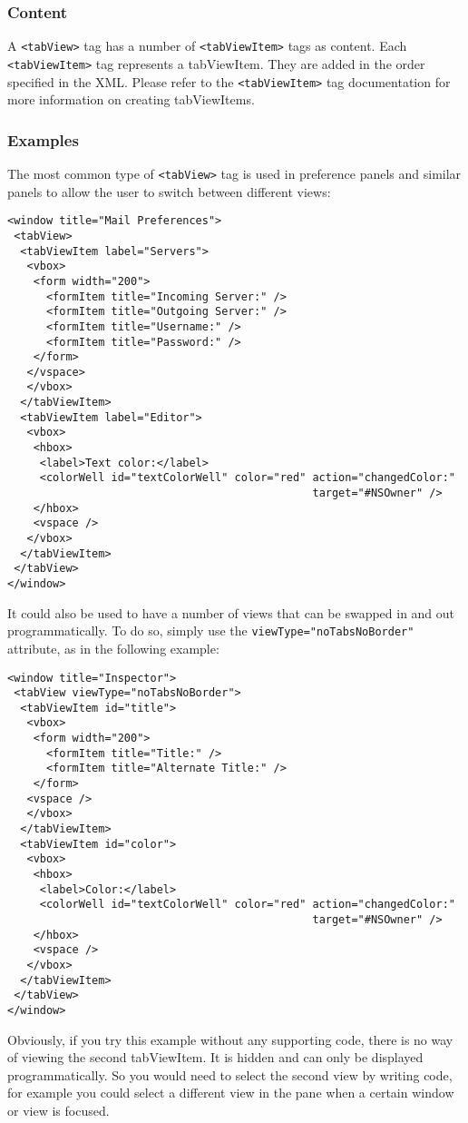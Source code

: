 \subsubsection{Content}
A \texttt{<tabView>} tag has a number of \texttt{<tabViewItem>} tags
as content.  Each \texttt{<tabViewItem>} tag represents a tabViewItem.
They are added in the order specified in the XML.  Please refer to the
\texttt{<tabViewItem>} tag documentation for more information on
creating tabViewItems.

\subsubsection{Examples}
The most common type of \texttt{<tabView>} tag is used in preference
panels and similar panels to allow the user to switch between
different views:
\begin{verbatim}
<window title="Mail Preferences">
 <tabView>
  <tabViewItem label="Servers">
   <vbox>
    <form width="200">
      <formItem title="Incoming Server:" />
      <formItem title="Outgoing Server:" />
      <formItem title="Username:" />
      <formItem title="Password:" />
    </form>
   </vspace>
   </vbox>
  </tabViewItem>
  <tabViewItem label="Editor">
   <vbox>
    <hbox>
     <label>Text color:</label>
     <colorWell id="textColorWell" color="red" action="changedColor:" 
                                               target="#NSOwner" />
    </hbox>
    <vspace />
   </vbox>
  </tabViewItem>
 </tabView>
</window>
\end{verbatim}

It could also be used to have a number of views that can be swapped in
and out programmatically.  To do so, simply use the
\texttt{viewType="noTabsNoBorder"} attribute, as in the following
example:
\begin{verbatim}
<window title="Inspector">
 <tabView viewType="noTabsNoBorder">
  <tabViewItem id="title">
   <vbox>
    <form width="200">
      <formItem title="Title:" />
      <formItem title="Alternate Title:" />
    </form>
   <vspace />
   </vbox>
  </tabViewItem>
  <tabViewItem id="color">
   <vbox>
    <hbox>
     <label>Color:</label>
     <colorWell id="textColorWell" color="red" action="changedColor:" 
                                               target="#NSOwner" />
    </hbox>
    <vspace />
   </vbox>
  </tabViewItem>
 </tabView>
</window>
\end{verbatim}
Obviously, if you try this example without any supporting code, there
is no way of viewing the second tabViewItem.  It is hidden and can
only be displayed programmatically.  So you would need to select the
second view by writing code, for example you could select a different
view in the pane when a certain window or view is focused.

